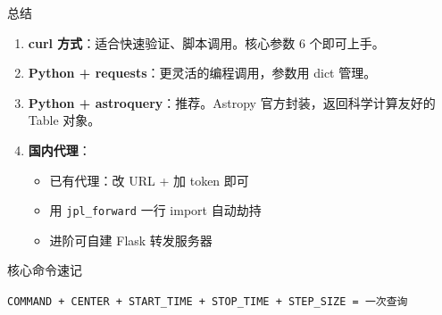 \documentclass[aspectratio=169]{ctexbeamer}
\begin{document}
\begin{frame}[shrink]{总结}
\large

\begin{enumerate}
  \setlength\itemsep{10pt}
  \item \textbf{curl 方式}：适合快速验证、脚本调用。核心参数 6 个即可上手。

  \item \textbf{Python + requests}：更灵活的编程调用，参数用 dict 管理。

  \item \textbf{Python + astroquery}：\alert{推荐}。Astropy 官方封装，返回科学计算友好的 Table 对象。

  \item \textbf{国内代理}：
  \begin{itemize}
    \item 已有代理：改 URL + 加 token 即可
    \item 用 \texttt{jpl\_forward} 一行 import 自动劫持
    \item 进阶可自建 Flask 转发服务器
  \end{itemize}
\end{enumerate}

\vspace{0.3cm}

\begin{block}{核心命令速记}
\begin{center}
\large\texttt{COMMAND + CENTER + START\_TIME + STOP\_TIME + STEP\_SIZE = 一次查询}
\end{center}
\end{block}
\end{frame}
\end{document}
